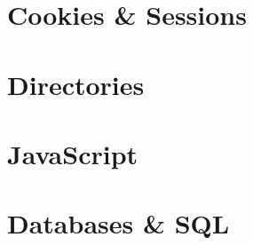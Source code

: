 




\section{Cookies \& Sessions}



\clearpage

\section{Directories}


\clearpage

\section{JavaScript}


\clearpage


\section{Databases \& SQL}


\clearpage

